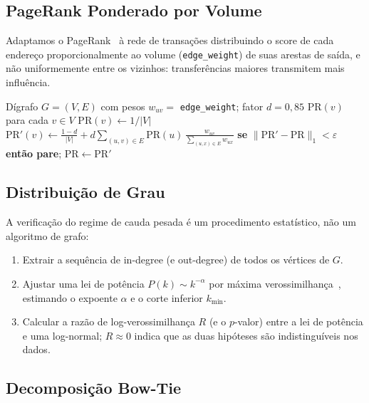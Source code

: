 \documentclass[12pt,a4paper]{article}
\begin{document}
\subsection{PageRank Ponderado por Volume}

Adaptamos o PageRank~\cite{page1999} à rede de transações distribuindo o score de cada endereço proporcionalmente ao volume (\texttt{edge\_weight}) de suas arestas de saída, e não uniformemente entre os vizinhos: transferências maiores transmitem mais influência.

\begin{algorithm}[H]
\caption{PageRank Ponderado por Volume}
\begin{algorithmic}[1]
\Require Dígrafo $G=(V,E)$ com pesos $w_{uv}=$ \texttt{edge\_weight}; fator $d=0{,}85$
\Ensure $\text{PR}(v)$ para cada $v \in V$
 $\text{PR}(v) \gets 1/|V|$ \EndFor
{}
    \State $\displaystyle \text{PR}'(v) \gets \frac{1-d}{|V|} + d \!\!\sum_{(u,v)\in E}\!\! \text{PR}(u)\,\frac{w_{uv}}{\sum_{(u,x)\in E} w_{ux}}$
  \EndFor
  \State \textbf{se} $\|\text{PR}'-\text{PR}\|_1 < \varepsilon$ \textbf{então pare}; \quad $\text{PR} \gets \text{PR}'$
\EndFor
\end{algorithmic}
\end{algorithm}

\subsection{Distribuição de Grau}

A verificação do regime de cauda pesada é um procedimento estatístico, não um algoritmo de grafo:

\begin{enumerate}[nosep,leftmargin=*]
\item Extrair a sequência de in-degree (e out-degree) de todos os vértices de $G$.
\item Ajustar uma lei de potência $P(k) \sim k^{-\alpha}$ por máxima verossimilhança~\cite{alstott2014}, estimando o expoente $\alpha$ e o corte inferior $k_{\min}$.
\item Calcular a razão de log-verossimilhança $R$ (e o $p$-valor) entre a lei de potência e uma log-normal; $R \approx 0$ indica que as duas hipóteses são indistinguíveis nos dados.
\end{enumerate}

\subsection{Decomposição Bow-Tie}
\end{document}
